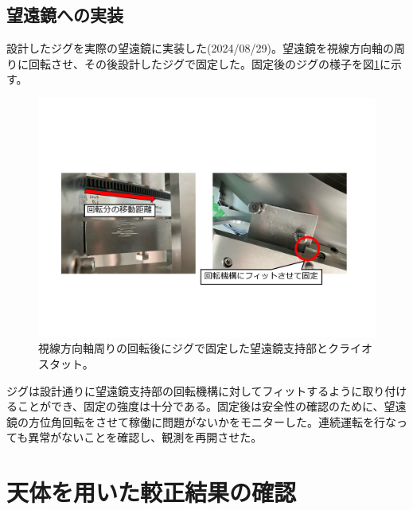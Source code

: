 \subsection{望遠鏡への実装}
設計したジグを実際の望遠鏡に実装した(2024/08/29)。望遠鏡を視線方向軸の周りに回転させ、その後設計したジグで固定した。固定後のジグの様子を図\ref{jig_install}に示す。
\begin{figure}[htbp]
  \centering
  \includegraphics[width=0.85\columnwidth]{5_alignment/figs/jig_install.pdf}
  \caption{視線方向軸周りの回転後にジグで固定した望遠鏡支持部とクライオスタット。}
  \label{jig_install}
\end{figure}
ジグは設計通りに望遠鏡支持部の回転機構に対してフィットするように取り付けることができ、固定の強度は十分である。固定後は安全性の確認のために、望遠鏡の方位角回転をさせて稼働に問題がないかをモニターした。連続運転を行なっても異常がないことを確認し、観測を再開させた。

\section{天体を用いた較正結果の確認}

